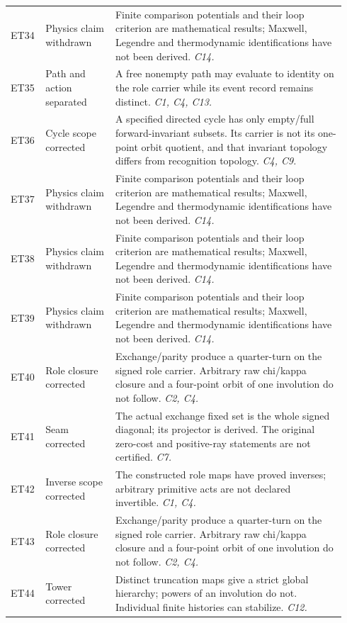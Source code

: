 \begin{longtable}{@{}>{\raggedright\arraybackslash}p{0.08\linewidth}>{\raggedright\arraybackslash}p{0.20\linewidth}>{\raggedright\arraybackslash}p{0.66\linewidth}@{}}
ET34 & Physics claim withdrawn & Finite comparison potentials and their loop criterion are mathematical results; Maxwell, Legendre and thermodynamic identifications have not been derived. \emph{C14.} \\[5pt]
ET35 & Path and action separated & A free nonempty path may evaluate to identity on the role carrier while its event record remains distinct. \emph{C1, C4, C13.} \\[5pt]
ET36 & Cycle scope corrected & A specified directed cycle has only empty/full forward-invariant subsets. Its carrier is not its one-point orbit quotient, and that invariant topology differs from recognition topology. \emph{C4, C9.} \\[5pt]
ET37 & Physics claim withdrawn & Finite comparison potentials and their loop criterion are mathematical results; Maxwell, Legendre and thermodynamic identifications have not been derived. \emph{C14.} \\[5pt]
ET38 & Physics claim withdrawn & Finite comparison potentials and their loop criterion are mathematical results; Maxwell, Legendre and thermodynamic identifications have not been derived. \emph{C14.} \\[5pt]
ET39 & Physics claim withdrawn & Finite comparison potentials and their loop criterion are mathematical results; Maxwell, Legendre and thermodynamic identifications have not been derived. \emph{C14.} \\[5pt]
ET40 & Role closure corrected & Exchange/parity produce a quarter-turn on the signed role carrier. Arbitrary raw chi/kappa closure and a four-point orbit of one involution do not follow. \emph{C2, C4.} \\[5pt]
ET41 & Seam corrected & The actual exchange fixed set is the whole signed diagonal; its projector is derived. The original zero-cost and positive-ray statements are not certified. \emph{C7.} \\[5pt]
ET42 & Inverse scope corrected & The constructed role maps have proved inverses; arbitrary primitive acts are not declared invertible. \emph{C1, C4.} \\[5pt]
ET43 & Role closure corrected & Exchange/parity produce a quarter-turn on the signed role carrier. Arbitrary raw chi/kappa closure and a four-point orbit of one involution do not follow. \emph{C2, C4.} \\[5pt]
ET44 & Tower corrected & Distinct truncation maps give a strict global hierarchy; powers of an involution do not. Individual finite histories can stabilize. \emph{C12.} \\[5pt]

\end{longtable}
